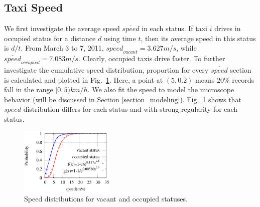 \subsection{Taxi Speed}
We first investigate the average speed $\overline{speed}$ in each status. If taxi $i$ drives in occupied status for a distance $d$ using time $t$, then its average speed in this status is $d/t$.
From March 3 to 7, 2011, ${\overline{speed}_{vacant}} = 3.627 m/s$, while ${\overline{speed}_{occupied}}=7.083 m/s$. Clearly, occupied taxis drive faster. To further investigate the cumulative speed distribution, proportion for every $\overline{speed}$ section is calculated and plotted in Fig.~\ref{figure_speed_distribution}. Here, a point at $(5,0.2)$ means $20\%$ records fall in the range $[0,5)km/h$. We also fit the speed to model the microscope behavior (will be discussed in Section \ref{section_modeling}). Fig.~\ref{figure_speed_distribution} shows that $\overline{speed}$ distribution differs for each status and with strong regularity for each status.

\begin{figure}[!h]
\centering
\includegraphics[width=0.4\textwidth]{figures_201103/fit/speedfit.eps}
\caption{Speed distributions for vacant and occupied statuses.}\label{figure_speed_distribution}
\end{figure}




